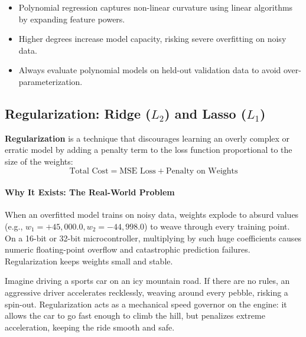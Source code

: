 \begin{takeaways}
\begin{itemize}
    \item Polynomial regression captures non-linear curvature using linear algorithms by expanding feature powers.
    \item Higher degrees increase model capacity, risking severe overfitting on noisy data.
    \item Always evaluate polynomial models on held-out validation data to avoid over-parameterization.
\end{itemize}
\end{takeaways}

\subsection{Regularization: Ridge ($L_2$) and Lasso ($L_1$)}

\begin{keyidea}[Regularization]
\textbf{Regularization} is a technique that discourages learning an overly complex or erratic model by adding a penalty term to the loss function proportional to the size of the weights:
\begin{equation}
\text{Total Cost} = \text{MSE Loss} + \text{Penalty on Weights}\label{eq:reg_general}
\end{equation}
\end{keyidea}

\paragraph{Why It Exists: The Real-World Problem}
When an overfitted model trains on noisy data, weights explode to absurd values (e.g., $w_1 = +45{,}000.0, w_2 = -44{,}998.0$) to weave through every training point. On a 16-bit or 32-bit microcontroller, multiplying by such huge coefficients causes numeric floating-point overflow and catastrophic prediction failures. Regularization keeps weights small and stable.

\begin{analogy}
Imagine driving a sports car on an icy mountain road. If there are no rules, an aggressive driver accelerates recklessly, weaving around every pebble, risking a spin-out. Regularization acts as a mechanical speed governor on the engine: it allows the car to go fast enough to climb the hill, but penalizes extreme acceleration, keeping the ride smooth and safe.
\end{analogy}


